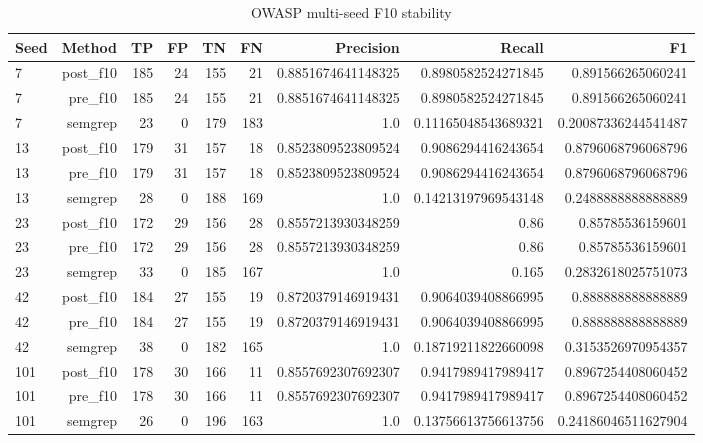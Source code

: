 \begin{table}[h]
\centering
\begin{tabular}{lrrrrrrrr}
\hline
Seed & Method & TP & FP & TN & FN & Precision & Recall & F1 \\
\hline
7 & post\_f10 & 185 & 24 & 155 & 21 & 0.8851674641148325 & 0.8980582524271845 & 0.891566265060241 \\
7 & pre\_f10 & 185 & 24 & 155 & 21 & 0.8851674641148325 & 0.8980582524271845 & 0.891566265060241 \\
7 & semgrep & 23 & 0 & 179 & 183 & 1.0 & 0.11165048543689321 & 0.20087336244541487 \\
13 & post\_f10 & 179 & 31 & 157 & 18 & 0.8523809523809524 & 0.9086294416243654 & 0.8796068796068796 \\
13 & pre\_f10 & 179 & 31 & 157 & 18 & 0.8523809523809524 & 0.9086294416243654 & 0.8796068796068796 \\
13 & semgrep & 28 & 0 & 188 & 169 & 1.0 & 0.14213197969543148 & 0.2488888888888889 \\
23 & post\_f10 & 172 & 29 & 156 & 28 & 0.8557213930348259 & 0.86 & 0.85785536159601 \\
23 & pre\_f10 & 172 & 29 & 156 & 28 & 0.8557213930348259 & 0.86 & 0.85785536159601 \\
23 & semgrep & 33 & 0 & 185 & 167 & 1.0 & 0.165 & 0.2832618025751073 \\
42 & post\_f10 & 184 & 27 & 155 & 19 & 0.8720379146919431 & 0.9064039408866995 & 0.888888888888889 \\
42 & pre\_f10 & 184 & 27 & 155 & 19 & 0.8720379146919431 & 0.9064039408866995 & 0.888888888888889 \\
42 & semgrep & 38 & 0 & 182 & 165 & 1.0 & 0.18719211822660098 & 0.3153526970954357 \\
101 & post\_f10 & 178 & 30 & 166 & 11 & 0.8557692307692307 & 0.9417989417989417 & 0.8967254408060452 \\
101 & pre\_f10 & 178 & 30 & 166 & 11 & 0.8557692307692307 & 0.9417989417989417 & 0.8967254408060452 \\
101 & semgrep & 26 & 0 & 196 & 163 & 1.0 & 0.13756613756613756 & 0.24186046511627904 \\
\hline
\end{tabular}
\caption{OWASP multi-seed F10 stability}
\end{table}
